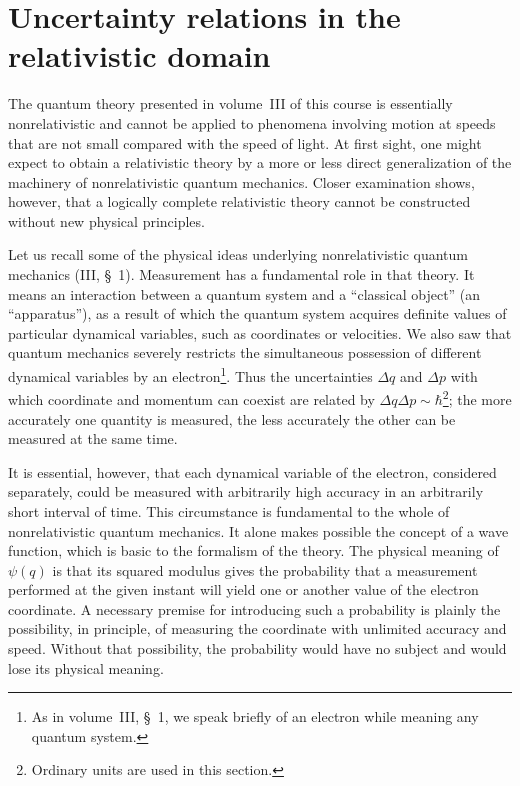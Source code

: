 \section{Uncertainty relations in the relativistic domain}

The quantum theory presented in volume~III of this course is essentially nonrelativistic and cannot be applied to phenomena involving motion at speeds that are not small compared with the speed of light. At first sight, one might expect to obtain a relativistic theory by a more or less direct generalization of the machinery of nonrelativistic quantum mechanics. Closer examination shows, however, that a logically complete relativistic theory cannot be constructed without new physical principles.

Let us recall some of the physical ideas underlying nonrelativistic quantum mechanics (III, \S~1). Measurement has a fundamental role in that theory. It means an interaction between a quantum system and a ``classical object'' (an ``apparatus''), as a result of which the quantum system acquires definite values of particular dynamical variables, such as coordinates or velocities. We also saw that quantum mechanics severely restricts the simultaneous possession of different dynamical variables by an electron\footnote{As in volume~III, \S~1, we speak briefly of an electron while meaning any quantum system.}. Thus the uncertainties $\Delta q$ and $\Delta p$ with which coordinate and momentum can coexist are related by $\Delta q \Delta p \sim \hbar$\footnote{Ordinary units are used in this section.}; the more accurately one quantity is measured, the less accurately the other can be measured at the same time.

It is essential, however, that each dynamical variable of the electron, considered separately, could be measured with arbitrarily high accuracy in an arbitrarily short interval of time. This circumstance is fundamental to the whole of nonrelativistic quantum mechanics. It alone makes possible the concept of a wave function, which is basic to the formalism of the theory. The physical meaning of $\psi(q)$ is that its squared modulus gives the probability that a measurement performed at the given instant will yield one or another value of the electron coordinate. A necessary premise for introducing such a probability is plainly the possibility, in principle, of measuring the coordinate with unlimited accuracy and speed. Without that possibility, the probability would have no subject and would lose its physical meaning.

